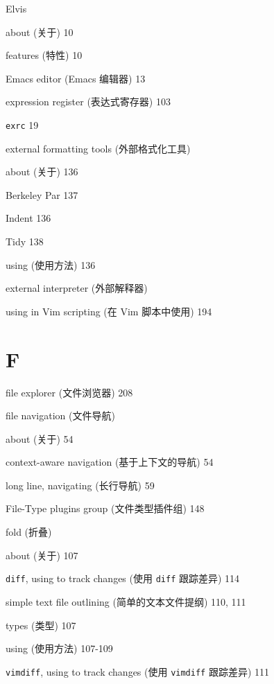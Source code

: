 \begin{multicols}{2}
\hangindent=2pc  Elvis \par
\hangindent=2pc \quad about (关于) 10 \par
\hangindent=2pc \quad features (特性) 10 \par

\hangindent=2pc  Emacs editor (Emacs 编辑器) 13

\hangindent=2pc  expression register (表达式寄存器) 103

\hangindent=2pc  \texttt{exrc} 19

\hangindent=2pc  external formatting tools (外部格式化工具) \par
\hangindent=2pc \quad about (关于) 136 \par
\hangindent=2pc \quad Berkeley Par 137 \par
\hangindent=2pc \quad Indent 136 \par
\hangindent=2pc \quad Tidy 138 \par
\hangindent=2pc \quad using (使用方法) 136 \par

\hangindent=2pc  external interpreter (外部解释器) \par
\hangindent=2pc \quad using in Vim scripting (在 Vim 脚本中使用) 194 \par

\hangindent=2pc  \section*{F}

\hangindent=2pc  file explorer (文件浏览器) 208

\hangindent=2pc  file navigation (文件导航) \par
\hangindent=2pc \quad about (关于) 54 \par
\hangindent=2pc \quad context-aware navigation (基于上下文的导航) 54 \par
\hangindent=2pc \quad long line, navigating (长行导航) 59 \par

\hangindent=2pc  File-Type plugins group (文件类型插件组) 148

\hangindent=2pc  fold (折叠) \par
\hangindent=2pc \quad about (关于) 107 \par
\hangindent=2pc \quad \texttt{diff}, using to track changes (使用 \texttt{diff} 跟踪差异) 114 \par
\hangindent=2pc \quad simple text file outlining (简单的文本文件提纲) 110, 111 \par
\hangindent=2pc \quad types (类型) 107 \par
\hangindent=2pc \quad using (使用方法) 107-109 \par
\hangindent=2pc \quad \texttt{vimdiff}, using to track changes (使用 \texttt{vimdiff} 跟踪差异) 111 \par


\end{multicols}
